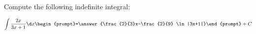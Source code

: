 \documentclass{ximera}
\author{Jim Talamo}
\begin{document}
\begin{exercise}
Compute the following indefinite integral:

\[
\int \frac{2x}{3x+1} \d x 
\begin{prompt}=\answer{\frac{2}{3}x-\frac{2}{9} \ln|3x+1|}\end{prompt}+C
\]
\end{exercise}
\end{document}
